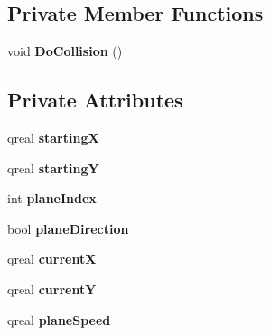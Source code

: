 \subsection*{Private Member Functions}
\begin{DoxyCompactItemize}
\item 
\hypertarget{classplane_a5b8c6d5ad84af4efb64ca3b9536bf071}{void {\bfseries Do\-Collision} ()}\label{classplane_a5b8c6d5ad84af4efb64ca3b9536bf071}

\end{DoxyCompactItemize}
\subsection*{Private Attributes}
\begin{DoxyCompactItemize}
\item 
\hypertarget{classplane_aaf522b494e4d68ccb5fe0614423ab8f9}{qreal {\bfseries starting\-X}}\label{classplane_aaf522b494e4d68ccb5fe0614423ab8f9}

\item 
\hypertarget{classplane_a1703e83da5bec6e4fcb6e5a55051ee0b}{qreal {\bfseries starting\-Y}}\label{classplane_a1703e83da5bec6e4fcb6e5a55051ee0b}

\item 
\hypertarget{classplane_aa424008b51f90740a2946190225ff911}{int {\bfseries plane\-Index}}\label{classplane_aa424008b51f90740a2946190225ff911}

\item 
\hypertarget{classplane_a44ad410c8f2d8417f50f9d3c691ac0fc}{bool {\bfseries plane\-Direction}}\label{classplane_a44ad410c8f2d8417f50f9d3c691ac0fc}

\item 
\hypertarget{classplane_a65b10df1c12caae50651103b209551c8}{qreal {\bfseries current\-X}}\label{classplane_a65b10df1c12caae50651103b209551c8}

\item 
\hypertarget{classplane_ae83d7dc07caed31cfff48d92f98d8ffa}{qreal {\bfseries current\-Y}}\label{classplane_ae83d7dc07caed31cfff48d92f98d8ffa}

\item 
\hypertarget{classplane_ad64ebf01deae230942cb32a9e6e00a2d}{qreal {\bfseries plane\-Speed}}\label{classplane_ad64ebf01deae230942cb32a9e6e00a2d}

\end{DoxyCompactItemize}


